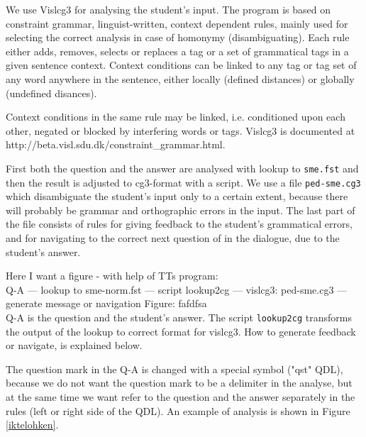 \documentclass[a4paper,12pt]{article}
\begin{document}
We use Vislcg3 for analysing the student's input. The program is based on constraint grammar, linguist-written, context dependent rules, mainly used for selecting the correct analysis in case of homonymy (disambiguating). Each rule either adds, removes, selects or replaces a tag or a set of grammatical tags in a given sentence context. Context conditions can be linked to any tag or tag set of any word anywhere in the sentence, either locally (defined distances) or globally (undefined disances). 

Context conditions in the same rule may be linked, i.e. conditioned upon each other, negated or blocked by interfering words or tags. Vislcg3 is documented at http://beta.visl.sdu.dk/constraint\_grammar.html.

First both the question and the answer are analysed with lookup to \texttt{sme.fst} and then the result is adjusted to cg3-format with a script. We use a file \texttt{ped-sme.cg3} which disambiguate the student's input only to a certain extent, because there will probably be grammar and orthographic errors in the input. The last part of the file consists of rules for giving feedback to the student's grammatical errors, and for navigating to the correct next question of in the dialogue, due to the student's answer.

Here I want a figure - with help of TTs program:\\
Q-A --- lookup to sme-norm.fst --- script lookup2cg --- vislcg3: ped-sme.cg3 --- generate message or navigation
Figure: fafdfsa\\

Q-A is the question and the student's answer. The script \texttt{lookup2cg} transforms the output of the lookup to correct format for vislcg3. How to generate feedback or navigate, is explained below.

The question mark in the Q-A is changed with a special symbol ("qst" QDL), because we do not want the question mark to be a delimiter in the analyse, but at the same time we want refer to the question and the answer separately in the rules (left or right side of the QDL). An example of analysis is shown in Figure \ref{iktelohken}.
\end{document}
